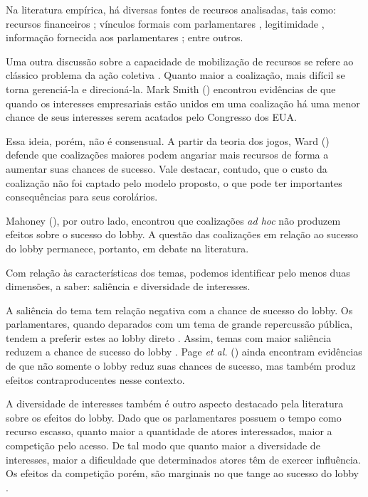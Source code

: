     Na literatura empírica, há diversas fontes de recursos analisadas, tais como: recursos financeiros \cite{dur2007question, eising2007institutional}; vínculos formais com parlamentares \cite{huwyler_no_2023}, legitimidade \cite{bunea2018legitimacy}, informação fornecida aos parlamentares \cite{kluver_informational_2012}; entre outros.

    Uma outra discussão sobre a capacidade de mobilização de recursos se refere ao clássico problema da ação coletiva \cite{olson1971logic}. Quanto maior a coalização, mais difícil se torna gerenciá-la e direcioná-la. Mark Smith (\citeyear{smith2000merican}) encontrou evidências de que quando os interesses empresariais estão unidos em uma coalização há uma menor chance de seus interesses serem acatados pelo Congresso dos EUA. 

    Essa ideia, porém, não é consensual. A partir da teoria dos jogos, Ward (\citeyear{ward_pressure_2004}) defende que coalizações maiores podem angariar mais recursos de forma a aumentar suas chances de sucesso. Vale destacar, contudo, que o custo da coalização não foi captado pelo modelo proposto, o que pode ter importantes consequências para seus corolários.

    Mahoney (\citeyear{mahoney_lobbying_2007}), por outro lado, encontrou que coalizações \textit{ad hoc} não produzem efeitos sobre o sucesso do lobby. A questão das coalizações em relação ao sucesso do lobby permanece, portanto, em debate na literatura.

Com relação às características dos temas, podemos identificar pelo menos duas dimensões, a saber: saliência e diversidade de interesses.

    A saliência do tema tem relação negativa com a chance de sucesso do lobby. Os parlamentares, quando deparados com um tema de grande repercussão pública, tendem a preferir estes ao lobby direto \cite{kollman1998outside}. Assim, temas com maior saliência reduzem a chance de sucesso do lobby \cite{mahoney_lobbying_2007}. Page \textit{et al.} (\citeyear{page1987moves}) ainda encontram evidências de que não somente o lobby reduz suas chances de sucesso, mas também produz efeitos contraproducentes nesse contexto.

    A diversidade de interesses também é outro aspecto destacado pela literatura sobre os efeitos do lobby. Dado que os parlamentares possuem o tempo como recurso escasso, quanto maior a quantidade de atores interessados, maior a competição pelo acesso. De tal modo que quanto maior a diversidade de interesses, maior a dificuldade que determinados atores têm de exercer influência. Os efeitos da competição porém, são marginais no que tange ao sucesso do lobby \cite{lowery_lobbying_2013}.

